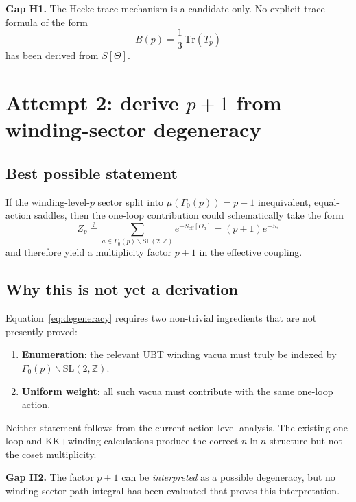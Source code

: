 \documentclass[12pt,a4paper]{article}
\theoremstyle{remark}
\begin{document}
\begin{gapbox}
\textbf{Gap H1.}  The Hecke-trace mechanism is a candidate only.  No explicit
trace formula of the form
\[
  B(p)=\frac{1}{3}\,\mathrm{Tr}(T_p)
\]
has been derived from $S[\Theta]$.
\end{gapbox}

\section{Attempt 2: derive $p+1$ from winding-sector degeneracy}

\subsection{Best possible statement}

If the winding-level-$p$ sector split into $\mu(\Gamma_0(p))=p+1$ inequivalent,
equal-action saddles, then the one-loop contribution could schematically take
the form
\begin{equation}
  Z_p
  \stackrel{?}{=}
  \sum_{a\in \Gamma_0(p)\backslash\mathrm{SL}(2,\mathbb{Z})}
  e^{-S_{\mathrm{eff}}[\Theta_a]}
  = (p+1)e^{-S_*}
  \label{eq:degeneracy}
\end{equation}
and therefore yield a multiplicity factor $p+1$ in the effective coupling.

\subsection{Why this is not yet a derivation}

Equation~\eqref{eq:degeneracy} requires two non-trivial ingredients that are not
presently proved:
\begin{enumerate}
  \item \textbf{Enumeration}: the relevant UBT winding vacua must truly be
        indexed by $\Gamma_0(p)\backslash\mathrm{SL}(2,\mathbb{Z})$.
  \item \textbf{Uniform weight}: all such vacua must contribute with the same
        one-loop action.
\end{enumerate}
Neither statement follows from the current action-level analysis.  The existing
one-loop and KK+winding calculations produce the correct $n\ln n$ structure but
not the coset multiplicity.

\begin{gapbox}
\textbf{Gap H2.}  The factor $p+1$ can be \emph{interpreted} as a possible
degeneracy, but no winding-sector path integral has been evaluated that proves
this interpretation.
\end{gapbox}
\end{document}
